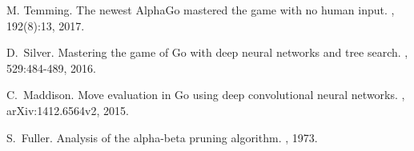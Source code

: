 \documentclass[11pt]{article}
\begin{document}
\begin{thebibliography}{99}

\newblock M. Temming.
\newblock The newest AlphaGo mastered the game with no human input.
, 192(8):13, 2017.

\newblock D.~Silver.
\newblock Mastering the game of Go with deep neural networks and tree search.
, 529:484-489, 2016.

\newblock C.~Maddison.
\newblock Move evaluation in Go using deep convolutional neural networks.
, arXiv:1412.6564v2, 2015.

\newblock S.~Fuller.
\newblock Analysis of the alpha-beta pruning algorithm. 
, 1973.

\end{thebibliography}
\end{document}
